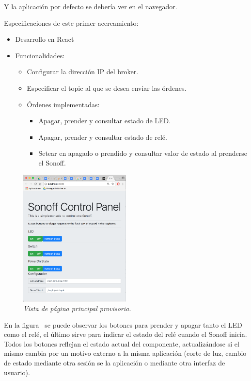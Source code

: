 Y la aplicación por defecto se debería ver en el navegador. 

Especificaciones de este primer acercamiento:

\begin{itemize}
  \item Desarrollo en React
  \item Funcionalidades:
  \begin{itemize}
    \item Configurar la dirección IP del broker.
    \item Especificar el topic al que se desea enviar las órdenes.
    \item Órdenes implementadas:
    \begin{itemize}
      \item Apagar, prender y consultar estado de LED.
      \item Apagar, prender y consultar estado de relé.
      \item Setear en apagado o prendido y consultar valor de estado al prenderse el Sonoff.
    \end{itemize}
  \end{itemize}
\end{itemize}
\newpage

\begin{figure}[H]
  \centering
  \includegraphics[width=0.5\textwidth, keepaspectratio]{images/vista-app-web}
  \caption{\textit{Vista de página principal provisoria.}}
  \label{fig:pag-prin-prov}
\end{figure}

En la figura~ se puede observar los botones para prender y apagar tanto el LED como el relé, el último sirve para indicar el estado del relé cuando el Sonoff inicia. Todos los botones reflejan el estado actual del componente, actualizándose si el mismo cambia por un motivo externo a la misma aplicación (corte de luz, cambio de estado mediante otra sesión se la aplicación o mediante otra interfaz de usuario).

